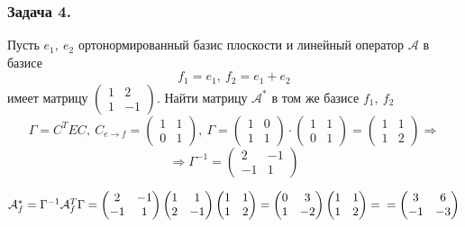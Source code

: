 \documentclass[12pt, letterpaper, twoside]{article}
\begin{document}
\subsubsection*{Задача 4.}
Пусть $e_1,\ e_2$ ортонормированный базис плоскости и линейный оператор $\mathcal{A}$ в базисе
\[f_1 = e_1,\ f_2 = e_1 + e_2\]
имеет матрицу $\begin{pmatrix}
    1 & 2\\
    1 & -1
\end{pmatrix}$. Найти матрицу $\mathcal{A}^*$ в том же базисе $f_1,\ f_2$
\[\Gamma = C^T E C,\ C_{e\to f} = \begin{pmatrix}
    1 & 1\\
    0 & 1
\end{pmatrix},\ \Gamma = \begin{pmatrix}
    1 & 0\\
    1 & 1
\end{pmatrix}\cdot \begin{pmatrix}
    1 & 1\\
    0 & 1
\end{pmatrix} = \begin{pmatrix}
    1 & 1\\
    1 & 2
\end{pmatrix}\Rightarrow\]
\[\Rightarrow \Gamma^{-1} = \begin{pmatrix}
    2 & -1\\
    -1 & 1
\end{pmatrix}\] 

$\mathcal{A}^*_f = \Gamma^{-1} \mathcal{A}_f^T \Gamma = \begin{pmatrix}
    2 & -1\\
    -1 & 1
\end{pmatrix}\begin{pmatrix}
    1 & 1\\
    2 & -1
\end{pmatrix}\begin{pmatrix}
    1 & 1\\
    1 & 2
\end{pmatrix} = \begin{pmatrix}
    0 & 3\\
    1 & -2
\end{pmatrix}\begin{pmatrix}
    1 & 1\\
    1 & 2
\end{pmatrix} =\\
= \begin{pmatrix}
    3 & 6\\
    -1 & -3
\end{pmatrix}$
\end{document}

